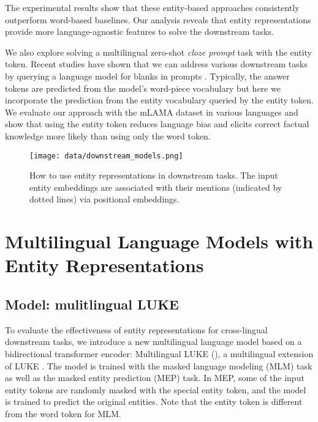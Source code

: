 \documentclass[11pt]{article}
\begin{document}
The experimental results show that these entity-based approaches consistently outperform word-based baselines.
Our analysis reveals that entity representations provide more language-agnostic features to solve the downstream tasks.

We also explore solving a multilingual zero-shot {\it cloze prompt} task \citep{Liu2021PretrainPA} with the entity \mask{} token.
Recent studies have shown that we can address various downstream tasks by querying a language model for blanks in prompts \citep{petroni-etal-2019-language,cui-etal-2021-template}.
Typically, the answer tokens are predicted from the model's word-piece vocabulary but here we incorporate the prediction from the entity vocabulary queried by the entity \mask{} token.
We evaluate our approach with the mLAMA dataset \citep{kassner-etal-2021-multilingual} in various languages and show that using the entity \mask{} token reduces language bias and elicits correct factual knowledge more likely than using only the word \mask{} token.
 \begin{figure*}[ht]

\begin{center}
  \texttt{[image: data/downstream\_models.png]}
  \caption{How to use entity representations in downstream tasks. The input entity embeddings are associated with their mentions (indicated by dotted lines) via positional embeddings.}
  \label{fig:downstream_models}
\end{center}
\vspace{-5mm}
\end{figure*}
 \section{Multilingual Language Models with Entity Representations}

\subsection{Model: mulitlingual LUKE}
To evaluate the effectiveness of entity representations for cross-lingual downstream tasks, we introduce a new multilingual language model based on a bidirectional transformer encoder: Multilingual LUKE (\mluke{}), a multilingual extension of LUKE \citep{yamada-etal-2020-luke}.
The model is trained with the masked language modeling (MLM) task \citep{NIPS2017_7181} as well as the masked entity prediction (MEP) task. In MEP, some of the input entity tokens are randomly masked with the special entity \mask{} token, and the model is trained to predict the original entities.
Note that the entity \mask{} token is different from the word \mask{} token for MLM.
\end{document}

